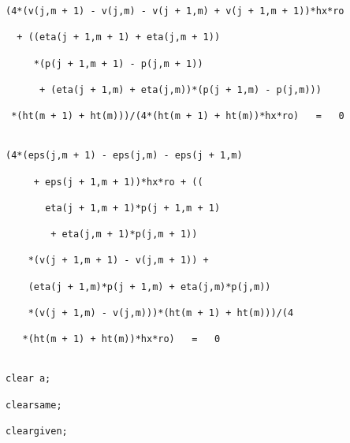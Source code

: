 \begin{verbatim}
(4*(v(j,m + 1) - v(j,m) - v(j + 1,m) + v(j + 1,m + 1))*hx*ro

  + ((eta(j + 1,m + 1) + eta(j,m + 1))

     *(p(j + 1,m + 1) - p(j,m + 1))

      + (eta(j + 1,m) + eta(j,m))*(p(j + 1,m) - p(j,m)))

 *(ht(m + 1) + ht(m)))/(4*(ht(m + 1) + ht(m))*hx*ro)   =   0


(4*(eps(j,m + 1) - eps(j,m) - eps(j + 1,m)

     + eps(j + 1,m + 1))*hx*ro + ((

       eta(j + 1,m + 1)*p(j + 1,m + 1)

        + eta(j,m + 1)*p(j,m + 1))

    *(v(j + 1,m + 1) - v(j,m + 1)) +

    (eta(j + 1,m)*p(j + 1,m) + eta(j,m)*p(j,m))

    *(v(j + 1,m) - v(j,m)))*(ht(m + 1) + ht(m)))/(4

   *(ht(m + 1) + ht(m))*hx*ro)   =   0


clear a;

clearsame;

cleargiven;
\end{verbatim}

